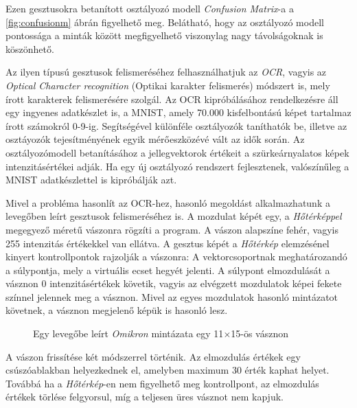 Ezen gesztusokra betanított osztályozó modell \textit{Confusion Matrix}-a a \ref{fig:confusionm} ábrán figyelhető meg. Belátható, hogy az osztályozó modell pontossága a minták között megfigyelhető viszonylag nagy távolságoknak is köszönhető.

Az ilyen típusú gesztusok felismeréséhez felhasználhatjuk az \textit{OCR}, vagyis az \textit{Optical Character recognition} (Optikai karakter felismerés) módszert is, mely írott karakterek felismerésére szolgál. 
Az OCR kipróbálásához rendelkezésre áll egy ingyenes adatkészlet is, a MNIST, amely 70.000 kisfelbontású képet tartalmaz írott számokról 0-9-ig. Segítségével különféle osztályozók taníthatók be, illetve az osztáyozók tejesítményének egyik mérőeszközévé vált az idők során. Az osztályozómodell betanításához a jellegvektorok értékeit a szürkeárnyalatos képek intenzitásértékei adják. Ha egy új osztályozó rendszert fejlesztenek, valószínűleg a MNIST adatkészlettel is kipróbálják azt. \cite{geron2019hands}

Mivel a probléma hasonlít az OCR-hez, hasonló megoldást alkalmazhatunk a levegőben leírt gesztusok felismeréséhez is. A mozdulat képét egy, a \textit{Hőtérképpel} megegyező méretű vászonra rögzíti a program. A vászon alapszíne fehér, vagyis 255 intenzitás értékekkel van ellátva. A gesztus képét a \textit{Hőtérkép} elemzésénel kinyert kontrollpontok rajzolják a vászonra: A vektorcsoportnak meghatározandó a súlypontja, mely a virtuális ecset hegyét jelenti. A súlypont elmozdulását a vásznon 0 intenzitásértékek követik, vagyis az elvégzett mozdulatok képei fekete színnel jelennek meg a vásznon. Mivel az egyes mozdulatok hasonló mintázatot követnek, a vásznon megjelenő képük is hasonló lesz.

\begin{figure}[h]
\centering
{}
\caption{Egy levegőbe leírt \textit{Omikron} mintázata egy 11$\times$15-ös vásznon}
\label{fig:ocr-gesture}
\end{figure}

A vászon frissítése két módszerrel történik. Az elmozdulás értékek egy csúszóablakban helyezkednek el, amelyben maximum  30 érték kaphat helyet. Továbbá ha a \textit{Hőtérkép}-en nem figyelhető meg kontrollpont, az elmozdulás értékek törlése felgyorsul, míg a teljesen üres vásznot nem kapjuk.

